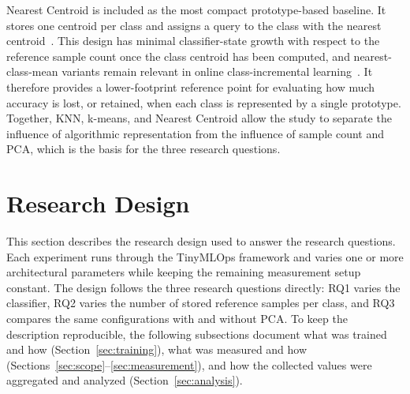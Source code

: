 \documentclass[sigconf,review,nonacm]{acmart}
\begin{document}
Nearest Centroid is included as the most compact prototype-based baseline.
It stores one centroid per class and assigns a query to the class with the nearest centroid~\cite{calafiore2019sparse,manning2008introduction}.
This design has minimal classifier-state growth with respect to the reference sample count once the class centroid has been computed, and nearest-class-mean variants remain relevant in online class-incremental learning~\cite{mai2021supervised}.
It therefore provides a lower-footprint reference point for evaluating how much accuracy is lost, or retained, when each class is represented by a single prototype.
Together, KNN, k-means, and Nearest Centroid allow the study to separate the influence of algorithmic representation from the influence of sample count and PCA, which is the basis for the three research questions.

\section{Research Design}
\label{sec:design}
This section describes the research design used to answer the research questions.
Each experiment runs through the TinyMLOps framework and varies one or more architectural parameters while keeping the remaining measurement setup constant.
The design follows the three research questions directly: RQ1 varies the classifier, RQ2 varies the number of stored reference samples per class, and RQ3 compares the same configurations with and without PCA.
To keep the description reproducible, the following subsections document what was trained and how (Section~\ref{sec:training}), what was measured and how (Sections~\ref{sec:scope}--\ref{sec:measurement}), and how the collected values were aggregated and analyzed (Section~\ref{sec:analysis}).
\end{document}
